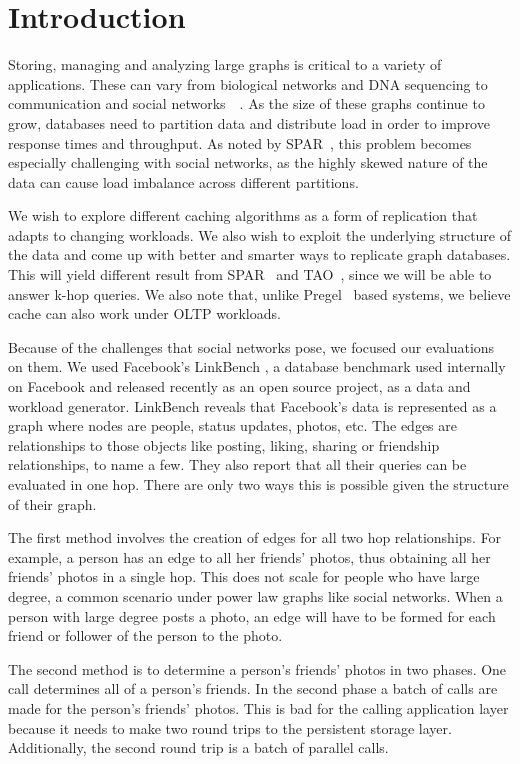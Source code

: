 
\section{Introduction}

Storing, managing and analyzing large graphs is critical to a variety of applications.
These can vary from biological networks and DNA sequencing to communication
and social networks~\cite{Mondal12}~\cite{Yang12}. As the size of these graphs
continue to grow, databases need to partition data and distribute load in order to
improve response times and throughput. As noted by SPAR~\cite{Pujol12}, this
problem becomes especially challenging with social networks, as the highly
skewed nature of the data can cause load imbalance across different partitions.

We wish to explore different caching algorithms as a form of replication that adapts
to changing workloads. We also wish to exploit the underlying structure of the data
and come up with better and smarter ways to replicate graph databases. This will yield
different result from SPAR~\cite{Pujol12} and TAO~\cite{Bronson13}, since we will be
able to answer k-hop queries. We also note that, unlike Pregel~\cite{Malewicz10}
based systems, we believe cache can also work under OLTP workloads.

Because of the challenges that social networks pose, we focused our evaluations on
them. We used Facebook's LinkBench \cite{Armstrong13}, a database benchmark
used internally on Facebook and released recently as an open source project, as a
data and workload generator. LinkBench reveals that Facebook's data is represented
as a graph where nodes are people, status updates, photos, etc. The edges are
relationships to those objects like posting, liking, sharing or friendship relationships,
to name a few. They also report that all their queries can be evaluated in one hop.
There are only two ways this is possible given the structure of their graph.

The first method involves the creation of edges for all two hop relationships. For
example, a person has an edge to all her friends' photos, thus obtaining all her
friends' photos in a single hop. This does not scale for people who have large
degree, a common scenario under power law graphs like social networks. When
a person with large degree posts a photo, an edge will have to be formed for each
friend or follower of the person to the photo.

The second method is to determine a person's friends' photos in two phases. One
call determines all of a person's friends. In the second phase a batch of calls
are made for the person's friends' photos. This is bad for the calling
application layer because it needs to make two round trips to the persistent
storage layer. Additionally, the second round trip is a batch of parallel calls.

